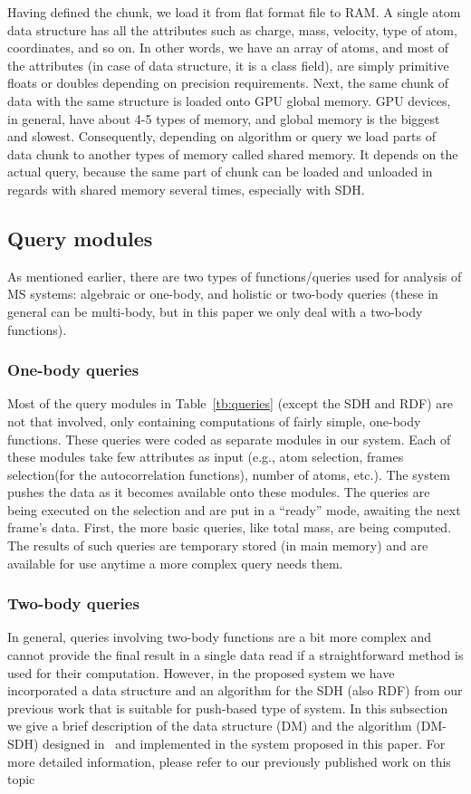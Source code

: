 \documentclass[10pt,journal,final,letterpaper,twocolumn]{IEEEtran}
\begin{document}
Having defined the chunk, we load it from flat format file to RAM. A single atom data structure has all the attributes such as charge, mass, velocity, type of atom, coordinates, and so on. In other words, we have an array of atoms, and most of the attributes (in case of data structure, it is a class field), are simply primitive floats or doubles depending on precision requirements. Next, the same chunk of data with the same structure is loaded onto GPU global memory. GPU devices, in general, have about 4-5 types of memory, and global memory is the biggest and slowest. Consequently, depending on algorithm or query we load parts of data chunk to another types of memory called shared memory. It depends on the actual query, because the same part of chunk can be loaded and unloaded in regards with shared memory several times, especially with SDH.


\subsection{Query modules}
As mentioned earlier, there are two types of functions/queries used
for analysis of MS systems: algebraic or one-body, and holistic or
two-body queries (these in general can be multi-body, but in this
paper we only deal with a two-body functions).

\subsubsection{One-body queries} Most of the query modules in
Table~\ref{tb:queries} (except the SDH and RDF) are not that
involved, only containing computations of fairly simple, one-body
functions. These queries were coded as separate modules in our
system. Each of these modules take few attributes as input (e.g.,
atom selection, frames selection(for the autocorrelation functions),
number of atoms, etc.). The system pushes the data as it becomes
available onto these modules. The queries are being executed on the
selection and are put in a ``ready'' mode, awaiting the next frame's
data. First, the more basic queries, like total mass, are being
computed. The results of such queries are temporary stored (in main
memory) and are available for use anytime a more complex query needs
them.

\subsubsection{Two-body queries} In general, queries involving two-body functions are a
bit more complex and cannot provide the final result in a single
data read if a straightforward method is used for their computation.
However, in the proposed system we have incorporated a data
structure and an algorithm for the SDH (also RDF) from our previous
work that is suitable for push-based type of system. In this
subsection we give a brief description of the data structure (DM)
and the algorithm (DM-SDH) designed in~\cite{ytu:icde09, EDBT12} and
implemented in the system proposed in this paper. For more detailed
information, please refer to our previously published work on this
topic~\cite{ytu:icde09, EDBT12}
\end{document}
